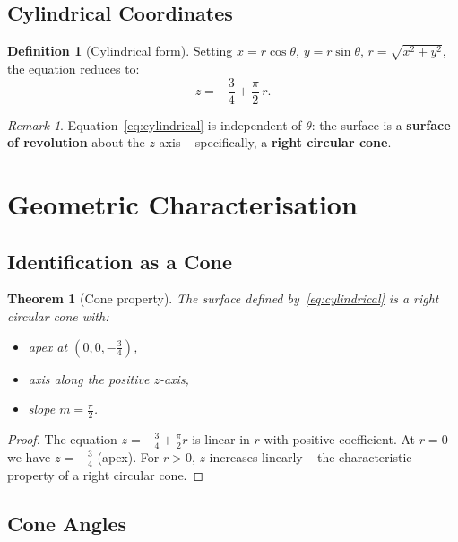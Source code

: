 \documentclass[12pt,a4paper]{article}
\theoremstyle{plain}
\newtheorem{theorem}{Theorem}[section]
\theoremstyle{definition}
\newtheorem{definition}{Definition}[section]
\theoremstyle{remark}
\newtheorem{remark}{Remark}[section]
\begin{document}
\subsection{Cylindrical Coordinates}

\begin{definition}[Cylindrical form]\label{def:cylindrical}
Setting $x = r\cos\theta$, $y = r\sin\theta$, $r = \sqrt{x^2+y^2}$, the equation
reduces to:
\begin{equation}\label{eq:cylindrical}
\boxed{z = -\frac{3}{4} + \frac{\pi}{2}\,r.}
\end{equation}
\end{definition}

\begin{remark}
Equation~\eqref{eq:cylindrical} is independent of $\theta$: the surface is a
\textbf{surface of revolution} about the $z$-axis -- specifically, a \textbf{right
circular cone}.
\end{remark}

\section{Geometric Characterisation}

\subsection{Identification as a Cone}

\begin{theorem}[Cone property]\label{thm:cone}
The surface defined by~\eqref{eq:cylindrical} is a right circular cone with:
\begin{itemize}
\item apex at $(0,0,-\tfrac{3}{4})$,
\item axis along the positive $z$-axis,
\item slope $m = \tfrac{\pi}{2}$.
\end{itemize}
\end{theorem}

\begin{proof}
The equation $z = -\tfrac{3}{4}+\tfrac{\pi}{2}r$ is linear in $r$ with positive
coefficient. At $r=0$ we have $z=-\tfrac{3}{4}$ (apex). For $r>0$, $z$ increases
linearly -- the characteristic property of a right circular cone.
\end{proof}

\subsection{Cone Angles}\label{sec:cone_angle}
\end{document}
